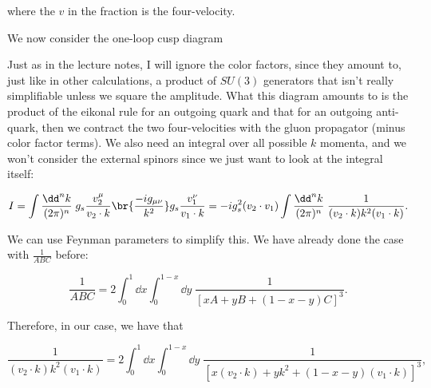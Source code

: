 where the $v$ in the fraction is the four-velocity.

We now consider the one-loop cusp diagram

\begin{center}
\end{center}

Just as in the lecture notes, I will ignore the color factors, since they amount to, just like in other calculations, a product of $SU(3)$ generators that isn't really simplifiable unless we square the amplitude. What this diagram amounts to is the product of the eikonal rule for an outgoing quark and that for an outgoing anti-quark, then we contract the two four-velocities with the gluon propagator (minus color factor terms). We also need an integral over all possible $k$ momenta, and we won't consider the external spinors since we just want to look at the integral itself:

\begin{equation}
  I = \int \frac{\dd^nk}{(2\pi)^n} \; g_s \frac{v_2^\mu}{v_2 \cdot k} \br{\frac{-ig_{\mu\nu}}{k^2}} g_s \frac{v_1^\nu}{v_1 \cdot k} = -ig_s^2 (v_2 \cdot v_1) \int \frac{\dd^nk}{(2\pi)^n} \; \frac{1}{(v_2 \cdot k)k^2(v_1 \cdot k)}.
\end{equation}

We can use Feynman parameters to simplify this. We have already done the case with $\frac{1}{ABC}$ before:

\begin{equation}
  \frac{1}{ABC} = 2\int_0^1\dd x \int_0^{1-x} \dd y \; \frac{1}{[xA + yB + (1-x-y)C]^3}.
\end{equation}

Therefore, in our case, we have that

\begin{equation}
  \frac{1}{(v_2 \cdot k)k^2(v_1 \cdot k)} = 2\int_0^1 \dd x \int_0^{1-x} \dd y \; \frac{1}{[x(v_2 \cdot k) + yk^2 + (1-x-y)(v_1 \cdot k)]^3},
\end{equation}

